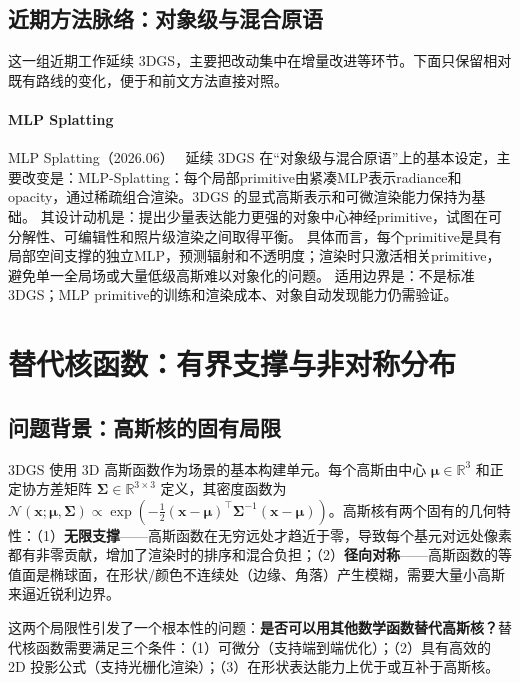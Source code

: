 

\subsection{近期方法脉络：对象级与混合原语}

这一组近期工作延续 3DGS，主要把改动集中在增量改进等环节。下面只保留相对既有路线的变化，便于和前文方法直接对照。

\paragraph{MLP Splatting}
MLP Splatting（2026.06）~\cite{2606_03877} 延续 3DGS 在“对象级与混合原语”上的基本设定，主要改变是：MLP-Splatting：每个局部primitive由紧凑MLP表示radiance和opacity，通过稀疏组合渲染。3DGS 的显式高斯表示和可微渲染能力保持为基础。
其设计动机是：提出少量表达能力更强的对象中心神经primitive，试图在可分解性、可编辑性和照片级渲染之间取得平衡。
具体而言，每个primitive是具有局部空间支撑的独立MLP，预测辐射和不透明度；渲染时只激活相关primitive，避免单一全局场或大量低级高斯难以对象化的问题。
适用边界是：不是标准3DGS；MLP primitive的训练和渲染成本、对象自动发现能力仍需验证。
\section{替代核函数：有界支撑与非对称分布}
\label{sec:03_3}

\subsection{问题背景：高斯核的固有局限}

3DGS 使用 3D 高斯函数作为场景的基本构建单元。每个高斯由中心 $\boldsymbol{\mu} \in \mathbb{R}^3$ 和正定协方差矩阵 $\boldsymbol{\Sigma} \in \mathbb{R}^{3\times 3}$ 定义，其密度函数为 $\mathcal{N}(\mathbf{x}; \boldsymbol{\mu}, \boldsymbol{\Sigma}) \propto \exp\left(-\frac{1}{2}(\mathbf{x}-\boldsymbol{\mu})^\top \boldsymbol{\Sigma}^{-1} (\mathbf{x}-\boldsymbol{\mu})\right)$。高斯核有两个固有的几何特性：（1）\textbf{无限支撑}——高斯函数在无穷远处才趋近于零，导致每个基元对远处像素都有非零贡献，增加了渲染时的排序和混合负担；（2）\textbf{径向对称}——高斯函数的等值面是椭球面，在形状/颜色不连续处（边缘、角落）产生模糊，需要大量小高斯来逼近锐利边界。

这两个局限性引发了一个根本性的问题：\textbf{是否可以用其他数学函数替代高斯核？}替代核函数需要满足三个条件：（1）可微分（支持端到端优化）；（2）具有高效的 2D 投影公式（支持光栅化渲染）；（3）在形状表达能力上优于或互补于高斯核。

